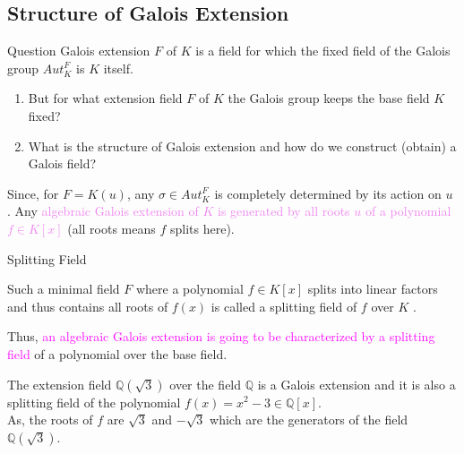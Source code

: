 \documentclass{beamer}
\begin{document}
\subsection{Structure of Galois Extension}
\begin{frame}{Question}
  Galois extension \(F\) of  \(K\) is a field for which the fixed field of the Galois group \(Aut_K^F\) is \(K\) itself.
  \vspace{3mm}

  \begin{tcolorbox}[colback=white, colframe=red, boxsep=1mm, title={\bfseries \color{white} Questions:}]
    \begin{enumerate}
    \item  But for what extension field \(F\) of \(K\) the Galois group keeps the base field \(K\) fixed?
    \item What is the structure of Galois extension and how do we construct (obtain) a Galois field?
    \end{enumerate}
  \end{tcolorbox}
  \vspace{3mm}

  Since, for \(F=K(u)\), any \(\sigma \in Aut_K^F\) is completely determined by its action on \(u\) \cite{hunger}. Any \textcolor{violet}{algebraic Galois extension of \(K\) is generated by all roots \(u\) of a polynomial \(f \in K[x]\)} (all roots means \(f\) splits here).
\end{frame}

\begin{frame}{Splitting Field}

     Such a minimal field \(F\) where a polynomial \(f \in K[x]\) splits into linear factors and thus contains all roots of \(f(x)\) is called a splitting field of \(f\) over \(K\) \cite{hunger}.
 \vspace{3mm}

 Thus, \textcolor{magenta}{an algebraic Galois extension is going to be characterized by a splitting field} of a polynomial over the base field.

 \vspace{3mm}
 \begin{tcolorbox}[colback=white, colframe=brown!80!black, boxsep=1mm, title={\bfseries \color{white} Example}]
   The extension field \(\mathbb{Q}(\sqrt{3})\) over the field \(\mathbb{Q}\) is a Galois extension and it is also a splitting field of the polynomial \(f(x)=x^2-3 \in \mathbb{Q}[x]\).\\

   As, the roots of \(f\) are \(\sqrt{3}\) and \(-\sqrt{3}\) which are the generators of the field \(\mathbb{Q}(\sqrt{3})\).
 \end{tcolorbox}
\end{frame}
\end{document}
